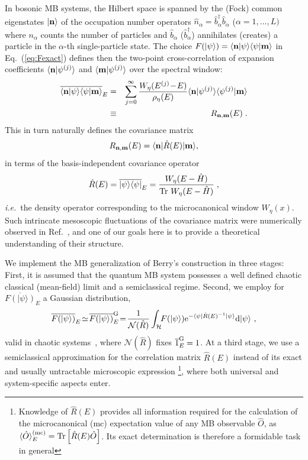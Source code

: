 \documentclass[prl,a4paper,twocolumn,superscriptaddress,floatfix]{revtex4-1}%
\newcommand{\ud}{\mathrm{d}}
\begin{document}
In bosonic MB systems, the Hilbert space is spanned by the (Fock) common eigenstates $|{\bf n}\rangle$ of the occupation number operators $\hat{n}_{\alpha}=\hat{b}_{\alpha}^{\dagger}\hat{b}_{\alpha}$ ($\alpha = 1, \ldots, L)$ where $n_\alpha$ counts the number of particles and $\hat{b}_{\alpha}$ ($\hat{b}_{\alpha}^{\dagger}$) annihilates (creates) a particle in the $\alpha$-th single-particle state. The choice $F(|\psi\rangle)=\langle {\bf n}|\psi\rangle \langle \psi|{\bf m}\rangle$ in Eq.~(\ref{eq:Fexact}) defines then the two-point cross-correlation of expansion coefficients $\langle {\bf n}|\psi^{(j)}\rangle$ and $\langle {\bf m}|\psi^{(j)}\rangle$ over the spectral window:
\begin{eqnarray}
\label{eq:Rnm}
\overline{\langle {\bf n}|\psi\rangle \langle \psi|{\bf m}\rangle}_{E}&=&\sum_{j=0}^{\infty}\frac{W_{\eta}(E^{(j)}\!-\!E)}{\rho_{\eta}(E)}\langle {\bf n}|\psi^{(j)}\rangle \langle \psi^{(j)}|{\bf m}\rangle \nonumber \\ &\equiv&R_{{\bf n},{\bf m}}(E) \; .
\end{eqnarray}
This in turn naturally defines the covariance matrix
\begin{equation}
\label{eq:CovR}
    R_{{\bf n},{\bf m}}(E)=\langle {\bf n}| \hat{R}(E)|{\bf m}\rangle,
\end{equation}
in terms of the basis-independent covariance operator
\begin{equation}
  \hat{R}(E)=\overline{|\psi\rangle\langle \psi |}_{E}=\frac{W_{\eta}(E-\hat{H})}{{\rm Tr~}W_{\eta}(E-\hat{H})} \; , 
  \label{eq:R}
\end{equation}
{\it i.e.}~the density operator corresponding to the microcanonical window $W_{\eta}(x)$. Such intrincate mesoscopic fluctuations of the covariance matrix were numerically observed in Ref.~\cite{nakerst2021eigenstate}, and one of our goals here is to provide a theoretical understanding of their structure. 

We implement the MB generalization of Berry's construction in three stages: First, it is assumed that the quantum MB system possesses a well defined chaotic classical (mean-field) limit and a semiclassical regime. Second, we employ for
$\overline{F(|\psi\rangle)}_{E}$
a Gaussian distribution, 
\begin{equation}
\label{eq:Gauss}
\overline{F(|\psi\rangle)}_{E}\!\simeq\!
\overline{F(|\psi\rangle)}_{E}^{\rm G}\!=\!
\frac{1}{\mathcal{N}(\hat{R})}\int_{{\cal H}}\!\!F(|\psi\rangle){\rm e}^{-\langle \psi |\hat{R}(E)^{-1}|\psi\rangle}\ud|\psi\rangle\ ,
\end{equation}
valid in chaotic systems~\cite{Sied1,JDUre,Heller_2007}, where $\mathcal{N}(\hat{R})$ fixes $\overline{1}_{E}^{\rm G}=1$. At a third stage, we use a semiclassical approximation for the correlation matrix $\hat{R}(E)$ instead of its exact and usually untractable microscopic expression \footnote{Knowledge of $\hat{R}(E)$ provides all information required for the calculation of the microcanonical (mc) expectation value of any MB observable $\hat{O}$, as $\langle \hat{O} \rangle^{(\rm mc)}_{E}={\rm Tr}\left[\hat{R}(E)\hat{O}\right]$. Its exact determination is therefore a formidable task in general}, where both universal and system-specific aspects enter.
\end{document}
